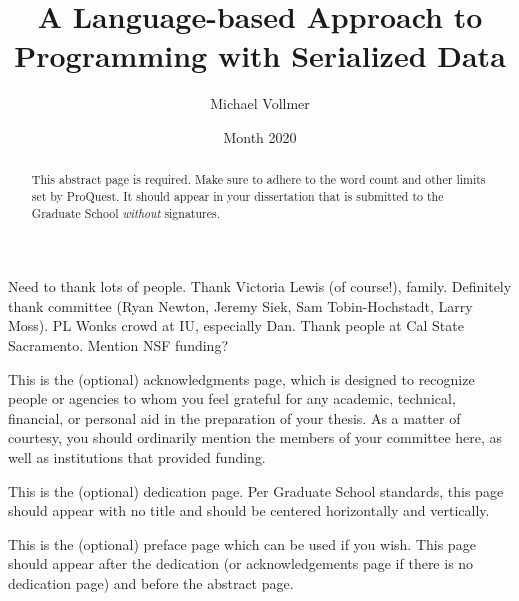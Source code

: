 \documentclass[showabstract,showacknowledgments,showpreface,showdedication]{iuphd}
\title{A Language-based Approach to Programming with Serialized Data}
\author{Michael Vollmer}
\date{Month 2020} %
\theoremstyle{nonumberplain}
\begin{document}
\maketitle
\acceptancepage




\begin{acknowledgments}
  Need to thank lots of people.
  Thank Victoria Lewis (of course!), family.
  Definitely thank committee (Ryan Newton, Jeremy Siek, Sam Tobin-Hochstadt, Larry Moss).
  PL Wonks crowd at IU, especially Dan.
  Thank people at Cal State Sacramento.
  Mention NSF funding?

This is the (optional) acknowledgments page, which is designed to recognize people or agencies to whom you feel grateful for any academic, technical, financial, or personal aid in the preparation of your thesis. As a matter of courtesy, you should ordinarily mention the members of your committee here, as well as institutions that provided funding.
\end{acknowledgments}


\begin{dedication}
This is the (optional) dedication page. Per Graduate School standards, this page should appear with no title and should be centered horizontally and vertically.
\end{dedication}


\begin{preface}
This is the (optional) preface page which can be used if you wish. This page should appear after the dedication (or acknowledgements page if there is no dedication page) and before the abstract page.
\end{preface}


\begin{abstract}
This abstract page is required. Make sure to adhere to the word count and other limits set by ProQuest. It should appear in your dissertation that is submitted to the Graduate School \emph{without} signatures.
\end{abstract}

\newpage


\tableofcontents
\end{document}
